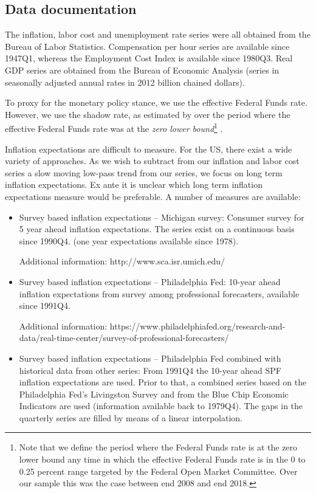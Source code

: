 \documentclass[11pt]{article}
\begin{document}
\pagebreak

\begin{appendices}
\section{Data documentation} \label{DataAnnex}
The inflation, labor cost and unemployment rate series were all obtained from the Bureau of Labor Statistics. Compensation per hour series are available since 1947Q1, whereas the Employment Cost Index is available since 1980Q3. Real GDP series are obtained from the Bureau of Economic Analysis (series in seasonally adjusted annual rates in 2012 billion chained dollars).

To proxy for the monetary policy stance, we use the effective Federal Funds rate. However, we use the shadow rate, as estimated by \cite{WuXia2016} over the period where the effective Federal Funds rate was at the \textit{zero lower bound}\footnote{Note that we define the period where the Federal Funds rate is at the zero lower bound any time in which the effective Federal Funds rate is in the 0 to 0.25 percent range targeted by the Federal Open Market Committee. Over our sample this was the case between end 2008 and end 2018.} .

Inflation expectations are difficult to measure. For the US, there exist a wide variety of approaches. As we wish to subtract from our inflation and labor cost series a slow moving low-pass trend from our series, we focus on long term inflation expectations. Ex ante it is unclear which long term inflation expectations measure would be preferable.  A number of measures are available: 
\begin{itemize}
\item Survey based inflation expectations – Michigan survey: Consumer survey for 5 year ahead inflation expectations. The series exist on a continuous basis since 1990Q4. (one year expectations available since 1978).

Additional information: http://www.sca.isr.umich.edu/
\item Survey based inflation expectations – Philadelphia Fed: 10-year ahead inflation expectations from survey among professional forecasters, available since 1991Q4.

Additional information: https://www.philadelphiafed.org/research-and-data/real-time-center/survey-of-professional-forecasters/
\item Survey based inflation expectations – Philadelphia Fed combined with historical data from other series: From 1991Q4 the 10-year ahead SPF inflation expectations are used. Prior to that, a combined series based on the Philadelphia Fed's Livingston Survey and from the Blue Chip Economic Indicators are used (information available back to 1979Q4). The gaps in the quarterly series are filled by means of a linear interpolation.


\end{itemize}
\end{appendices}
\end{document}
